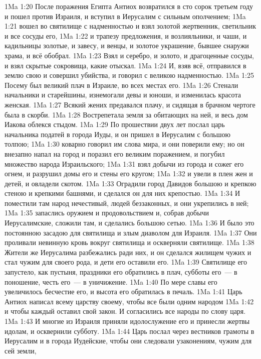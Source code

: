 \rsbpar\vs 1Ma 1:20 После поражения Египта Антиох возвратился в сто сорок третьем году и пошел против Израиля, и вступил в Иерусалим с сильным ополчением;
\vs 1Ma 1:21 вошел во святилище с надменностью и взял золотой жертвенник, светильник и все сосуды его,
\vs 1Ma 1:22 и трапезу предложения, и возлияльники, и чаши, и кадильницы золотые, и завесу, и венцы, и золотое украшение, бывшее снаружи храма, и всё обобрал.
\vs 1Ma 1:23 Взял и серебро, и золото, и драгоценные сосуды, и взял скрытые сокровища, какие отыскал.
\vs 1Ma 1:24 И, взяв всё, отправился в землю свою и совершил убийства, и говорил с великою надменностью.
\vs 1Ma 1:25 Посему был великий плач в Израиле, во всех местах его.
\vs 1Ma 1:26 Стенали начальники и старейшины, изнемогали девы и юноши, и изменилась красота женская.
\vs 1Ma 1:27 Всякий жених предавался плачу, и сидящая в брачном чертоге была в скорби.
\vs 1Ma 1:28 Вострепетала земля за обитающих на ней, и весь дом Иакова облекся стыдом.
\rsbpar\vs 1Ma 1:29 По прошествии двух лет послал царь начальника податей в города Иуды, и он пришел в Иерусалим с большою толпою;
\vs 1Ma 1:30 коварно говорил им слова мира, и они поверили ему; но он внезапно напал на город и поразил его великим поражением, и погубил множество народа Израильского;
\vs 1Ma 1:31 взял добычи из города и сожег его огнем, и разрушил домы его и стены его кругом;
\vs 1Ma 1:32 и увели в плен жен и детей, и овладели скотом.
\vs 1Ma 1:33 Оградили город Давидов большою и крепкою стеною и крепкими башнями, и сделался он для них крепостью.
\vs 1Ma 1:34 И поместили там народ нечестивый, людей беззаконных, и они укрепились в ней;
\vs 1Ma 1:35 запаслись оружием и продовольствием и, собрав добычи Иерусалимские, сложили там, и сделались большою сетью.
\vs 1Ma 1:36 И было это постоянною засадою для святилища и злым диаволом для Израиля.
\vs 1Ma 1:37 Они проливали невинную кровь вокруг святилища и оскверняли святилище.
\vs 1Ma 1:38 Жители же Иерусалима разбежались ради них, и он сделался жилищем чужих и стал чужим для своего рода, и дети его оставили его.
\vs 1Ma 1:39 Святилище его запустело, как пустыня, праздники его обратились в плач, субботы его~--- в поношение, честь его~--- в уничижение.
\vs 1Ma 1:40 По мере славы его увеличилось бесчестие его, и высота его обратилась в печаль.
\rsbpar\vs 1Ma 1:41 Царь Антиох написал всему царству своему, чтобы все были одним народом
\vs 1Ma 1:42 и чтобы каждый оставил свой закон. И согласились все народы по слову царя.
\vs 1Ma 1:43 И многие из Израиля приняли идолослужение его и принесли жертвы идолам, и осквернили субботу.
\vs 1Ma 1:44 Царь послал через вестников грамоты в Иерусалим и в города Иудейские, чтобы они следовали узаконениям, чужим для сей земли,
